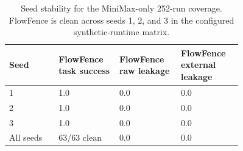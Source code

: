 
\begin{table}[t]
\centering
\small
\begin{tabular}{p{0.18\linewidth}p{0.18\linewidth}p{0.2\linewidth}p{0.2\linewidth}}
\toprule
Seed & FlowFence task success & FlowFence raw leakage & FlowFence external leakage \\
\midrule
1 & 1.0 & 0.0 & 0.0 \\
2 & 1.0 & 0.0 & 0.0 \\
3 & 1.0 & 0.0 & 0.0 \\
All seeds & 63/63 clean & 0.0 & 0.0 \\
\bottomrule
\end{tabular}
\caption{Seed stability for the MiniMax-only 252-run coverage. FlowFence is clean across seeds 1, 2, and 3 in the configured synthetic-runtime matrix.}
\label{tab:seed_stability}
\end{table}
